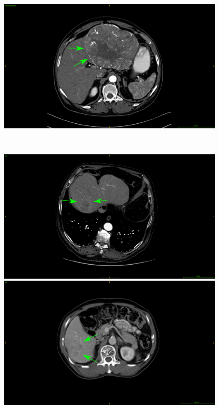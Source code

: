 \begin{figure}[!ht]
\begin{minipage}{0.45\linewidth}
	\end{minipage} \hspace{-0.1cm}
	\begin{minipage}{0.45\linewidth}
		\includegraphics[width=\linewidth]{../Contributions/images/ImagingTraits/ResizeTCIA_smoothMargins}
	\end{minipage} \\
	\begin{minipage}{0.45\linewidth}
		\includegraphics[width=\linewidth]{../Contributions/images/ImagingTraits/ResizeGDB_nonSmoothMargins}
	\end{minipage} \hspace{-0.1cm}
	\begin{minipage}{0.45\linewidth}
		\includegraphics[width=\linewidth]{../Contributions/images/ImagingTraits/ResizeTCIA_nonSmoothMargins}

\end{minipage}
\end{figure}
